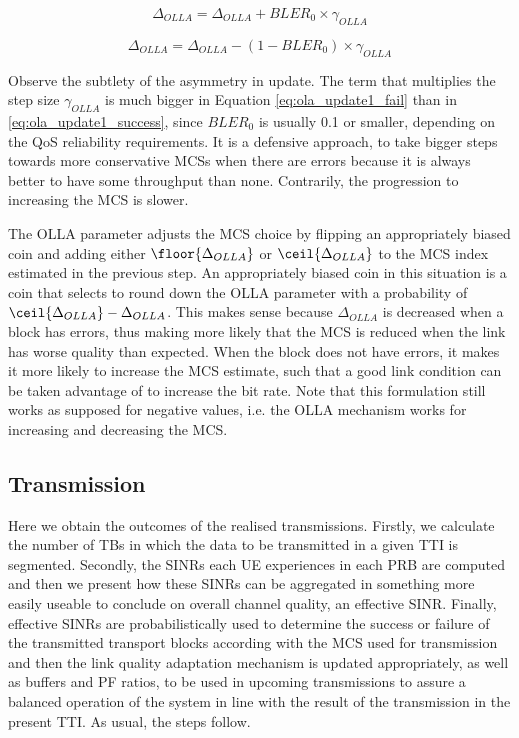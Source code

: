 \begin{equation} \label{eq:ola_update1_success}
    \Delta_{OLLA} = \Delta_{OLLA} + BLER_0 \times \gamma_{OLLA}
\end{equation}

\begin{equation} \label{eq:ola_update1_fail}
    \Delta_{OLLA} = \Delta_{OLLA} - (1 - BLER_0) \times \gamma_{OLLA}
\end{equation}

Observe the subtlety of the asymmetry in update. The term that multiplies the step size $\gamma_{OLLA}$ is much bigger in Equation \eqref{eq:ola_update1_fail} than in \eqref{eq:ola_update1_success}, since $BLER_0$ is usually 0.1 or smaller, depending on the QoS reliability requirements. It is a defensive approach, to take bigger steps towards more conservative MCSs when there are errors because it is always better to have some throughput than none. Contrarily, the progression to increasing the MCS is slower. 

The OLLA parameter adjusts the MCS choice by flipping an appropriately biased coin and adding either $\floor{\Delta_{OLLA}}$ or $\ceil{\Delta_{OLLA}}$ to the MCS index estimated in the previous step. An appropriately biased coin in this situation is a coin that selects to round down the OLLA parameter with a probability of $\ceil{\Delta_{OLLA}} - \Delta_{OLLA}$. This makes sense because $\Delta_{OLLA}$ is decreased when a block has errors, thus making more likely that the MCS is reduced when the link has worse quality than expected. When the block does not have errors, it makes it more likely to increase the MCS estimate, such that a good link condition can be taken advantage of to increase the bit rate. Note that this formulation still works as supposed for negative values, i.e. the OLLA mechanism works for increasing and decreasing the MCS.

\subsection{Transmission}

Here we obtain the outcomes of the realised transmissions. Firstly, we calculate the number of TBs in which the data to be transmitted in a given TTI is segmented. Secondly, the SINRs each UE experiences in each PRB are computed and then we present how these SINRs can be aggregated in something more easily useable to conclude on overall channel quality, an effective SINR. Finally, effective SINRs are probabilistically used to determine the success or failure of the transmitted transport blocks according with the MCS used for transmission and then the link quality adaptation mechanism is updated appropriately, as well as buffers and PF ratios, to be used in upcoming transmissions to assure a balanced operation of the system in line with the result of the transmission in the present TTI. As usual, the steps follow.

